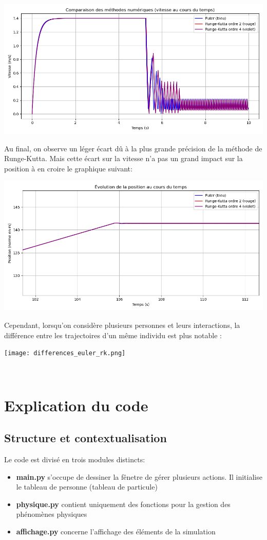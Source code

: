 \documentclass[a4paper,12pt]{article}
\begin{document}
\includegraphics[width=\textwidth]{runge.png}

Au final, on observe un léger écart dû à la plus grande précision de la méthode de Runge-Kutta. Mais cette écart sur la vitesse n'a pas un grand impact sur la position à en croire le graphique suivant:

\includegraphics[width=\textwidth]{runge_pos.png}

Cependant, lorsqu'on considère plusieurs personnes et leurs interactions, la différence entre les trajectoires d'un même individu est plus notable :

\texttt{[image: differences\_euler\_rk.png]}

\
\section{Explication du code}
\subsection{Structure et contextualisation}
\noindent Le code est divisé en trois modules distincts:
\begin{itemize}
	\item \textbf{main.py} s'occupe de dessiner la fênetre de gérer plusieurs actions. Il initialise le tableau de personne (tableau de particule)
	
	\item \textbf{physique.py} contient uniquement des fonctions pour la gestion des phénomènes physiques

 	\item \textbf{affichage.py} concerne l'affichage des éléments de la simulation
\end{itemize}
\end{document}
